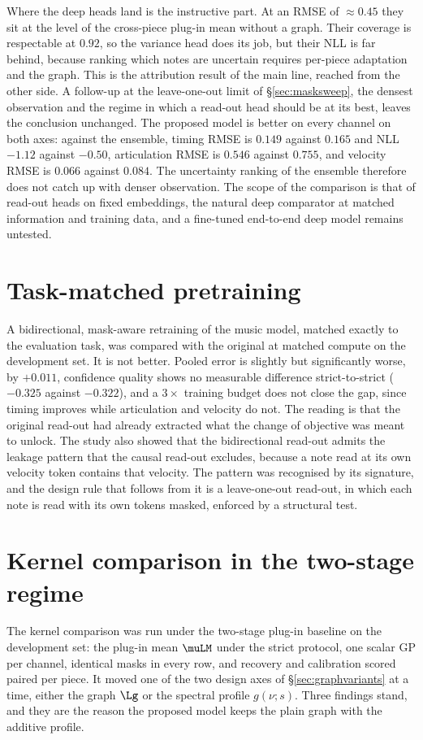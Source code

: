 Where the deep heads land is the instructive part. At an RMSE of
$\approx 0.45$ they sit at the level of the cross-piece plug-in mean
without a graph. Their coverage is respectable at $0.92$, so the variance
head does its job, but their NLL is far behind, because ranking which notes
are uncertain requires per-piece adaptation and the graph. This is the
attribution result of the main line, reached from the other side. A
follow-up at the leave-one-out limit of \S\ref{sec:masksweep}, the densest
observation and the regime in which a read-out head should be at its best,
leaves the conclusion unchanged. The proposed model is better on every
channel on both axes: against the ensemble, timing RMSE is $0.149$ against
$0.165$ and NLL $-1.12$ against $-0.50$, articulation RMSE is $0.546$
against $0.755$, and velocity RMSE is $0.066$ against $0.084$. The
uncertainty ranking of the ensemble therefore does not catch up with denser
observation. The scope of the comparison is that of read-out heads on fixed
embeddings, the natural deep comparator at matched information and training
data, and a fine-tuned end-to-end deep model remains untested.

\section{Task-matched pretraining}
A bidirectional, mask-aware retraining of the music model, matched exactly
to the evaluation task, was compared with the original at matched compute on
the development set. It is not better. Pooled error is slightly but
significantly worse, by $+0.011$, confidence quality shows no measurable
difference strict-to-strict ($-0.325$ against $-0.322$), and a $3\times$
training budget does not close the gap, since timing improves while
articulation and velocity do not. The reading is that the original read-out
had already extracted what the change of objective was meant to unlock. The
study also showed that the bidirectional read-out admits the leakage pattern
that the causal read-out excludes, because a note read at its own velocity
token contains that velocity. The pattern was recognised by its signature,
and the design rule that follows from it is a leave-one-out read-out, in
which each note is read with its own tokens masked, enforced by a
structural test.

\section{Kernel comparison in the two-stage regime}\label{sec:kernels}
The kernel comparison was run under the two-stage plug-in baseline on the
development set: the plug-in mean $\muLM$ under the strict protocol, one
scalar GP per channel, identical masks in every row, and recovery and
calibration scored paired per piece. It moved one of the two design axes of
\S\ref{sec:graphvariants} at a time, either the graph $\Lg$ or the spectral
profile $g(\nu;s)$. Three findings stand, and they are the reason the
proposed model keeps the plain graph with the additive profile.

